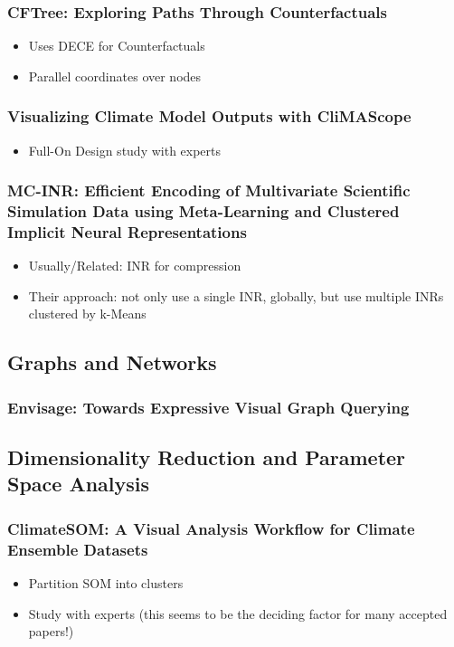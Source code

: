 \documentclass[a4paper]{article}
\begin{document}
\subsubsection{CFTree: Exploring Paths Through Counterfactuals}
\begin{itemize}
    \item Uses DECE for Counterfactuals
    \item Parallel coordinates over nodes
\end{itemize}
\subsubsection{Visualizing Climate Model Outputs with CliMAScope}
\begin{itemize}
    \item Full-On Design study with experts
\end{itemize}
\subsubsection{MC-INR: Efficient Encoding of Multivariate Scientific Simulation Data using Meta-Learning and Clustered Implicit Neural Representations}
\begin{itemize}
    \item Usually/Related: INR for compression
    \item Their approach: not only use a single INR, globally, but use multiple INRs clustered by k-Means
\end{itemize}
\subsection{Graphs and Networks}
\subsubsection{Envisage: Towards Expressive Visual Graph Querying}

\subsection{Dimensionality Reduction and Parameter Space Analysis}

\subsubsection{ClimateSOM: A Visual Analysis Workflow for Climate Ensemble Datasets}
\begin{itemize}
    \item Partition SOM into clusters
    \item Study with experts (this seems to be the deciding factor for many accepted papers!)
\end{itemize}
\end{document}
